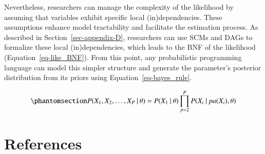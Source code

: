 \documentclass[
  authoryear,
  review,
  1p]{elsarticle}
\begin{document}
Nevertheless, researchers can manage the complexity of the likelihood by
assuming that variables exhibit specific local (in)dependencies. These
assumptions enhance model tractability and facilitate the estimation
process. As described in Section~\ref{sec-appendix-D}, researchers can
use SCMs and DAGs to formalize these local (in)dependencies, which leads
to the BNF of the likelihood (Equation~\ref{eq-like_BNF}). From this
point, any probabilistic programming language can model this simpler
structure and generate the parameter's posterior distribution from its
priors using Equation~\ref{eq-bayes_rule}.

\begin{equation}\phantomsection\label{eq-like_BNF}{
P(X_{1}, X_{2}, \dots, X_{P} \: | \: \theta) = P(X_{1} \: | \: \theta) \prod^{P}_{p=2} P(X_{i} \: | \: pa(X_{i}), \theta )
}\end{equation}

\newpage{}

\section*{References}\label{references}

\renewcommand{\bibsection}{}

\end{document}
